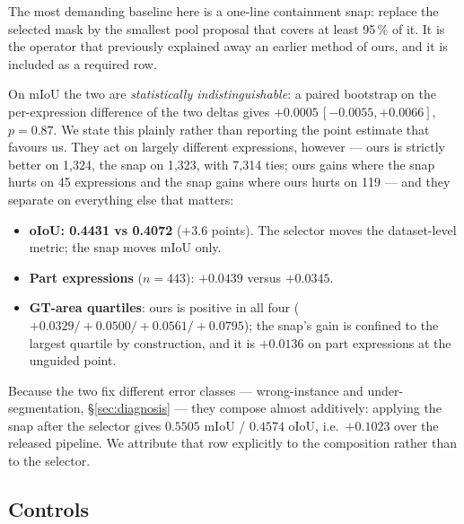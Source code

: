 The most demanding baseline here is a one-line containment snap: replace the
selected mask by the smallest pool proposal that covers at least 95\,\% of it.
It is the operator that previously explained away an earlier method of ours,
and it is included as a required row.

On mIoU the two are \emph{statistically indistinguishable}: a paired bootstrap
on the per-expression difference of the two deltas gives
$+0.0005\,[-0.0055,+0.0066]$, $p=0.87$. We state this plainly rather than
reporting the point estimate that favours us. They act on largely different
expressions, however --- ours is strictly better on 1{,}324, the snap on
1{,}323, with 7{,}314 ties; ours gains where the snap hurts on 45 expressions
and the snap gains where ours hurts on 119 --- and they separate on everything
else that matters:

\begin{itemize}
\item \textbf{oIoU: 0.4431 vs 0.4072} ($+3.6$ points). The selector moves the
dataset-level metric; the snap moves mIoU only.
\item \textbf{Part expressions} ($n=443$): $+0.0439$ versus $+0.0345$.
\item \textbf{GT-area quartiles}: ours is positive in all four
($+0.0329 / +0.0500 / +0.0561 / +0.0795$); the snap's gain is confined to the
largest quartile by construction, and it is $+0.0136$ on part expressions at
the unguided point.
\end{itemize}

Because the two fix different error classes --- wrong-instance and
under-segmentation, §\ref{sec:diagnosis} --- they compose almost additively:
applying the snap after the selector gives $0.5505$ mIoU / $0.4574$ oIoU, i.e.\
$+0.1023$ over the released pipeline. We attribute that row explicitly to the
composition rather than to the selector.

\subsection{Controls}
\label{sec:controls}

